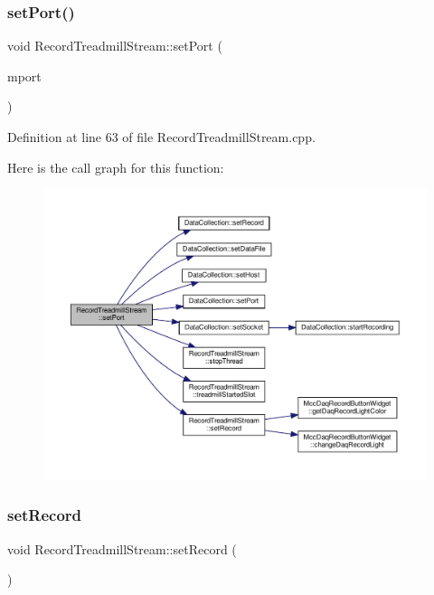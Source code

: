 \subsubsection{\texorpdfstring{set\+Port()}{setPort()}}
{\footnotesize\ttfamily void Record\+Treadmill\+Stream\+::set\+Port (\begin{DoxyParamCaption}\item[{Q\+String}]{mport }\end{DoxyParamCaption})}



Definition at line 63 of file Record\+Treadmill\+Stream.\+cpp.

Here is the call graph for this function\+:
\nopagebreak
\begin{figure}[H]
\begin{center}
\leavevmode
\includegraphics[width=350pt]{class_record_treadmill_stream_ae16198d0acd13cb4fa401ae1d00e2282_cgraph}
\end{center}
\end{figure}
\mbox{\label{class_record_treadmill_stream_acc6674f00b212bb11e642f9d54a2edb4}} 
\subsubsection{\texorpdfstring{set\+Record}{setRecord}}
{\footnotesize\ttfamily void Record\+Treadmill\+Stream\+::set\+Record (\begin{DoxyParamCaption}{ }\end{DoxyParamCaption})\hspace{0.3cm}{\ttfamily [slot]}}



